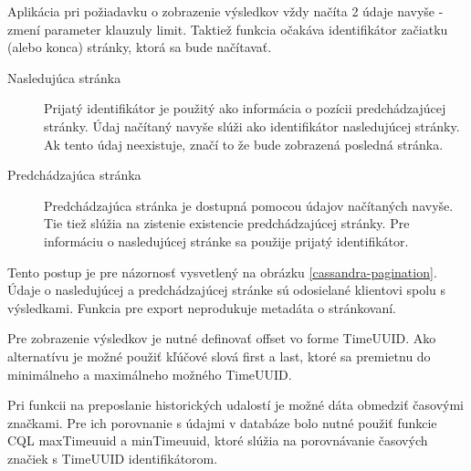 		Aplikácia pri požiadavku o zobrazenie výsledkov vždy načíta 2 údaje navyše - zmení parameter klauzuly limit. Taktiež funkcia očakáva identifikátor začiatku (alebo konca) stránky, ktorá sa bude načítavať.
		\begin{description}
			\item[Nasledujúca stránka] Prijatý identifikátor je použitý ako informácia o pozícii predchádzajúcej stránky. Údaj načítaný navyše slúži ako identifikátor nasledujúcej stránky. Ak tento údaj neexistuje, značí to že bude zobrazená posledná stránka.
				
			\item[Predchádzajúca stránka] Predchádzajúca stránka je dostupná pomocou údajov načítaných navyše. Tie tiež slúžia na zistenie existencie predchádzajúcej stránky. Pre informáciu o nasledujúcej stránke sa použije prijatý identifikátor.
		\end{description}
		
		Tento postup je pre názornosť vysvetlený na obrázku \ref{cassandra-pagination}. Údaje o nasledujúcej a predchádzajúcej stránke sú odosielané klientovi spolu s výsledkami. Funkcia pre export neprodukuje metadáta o stránkovaní. 
		
		Pre zobrazenie výsledkov je nutné definovať offset vo forme TimeUUID. Ako alternatívu je možné použiť kľúčové slová first a last, ktoré sa premietnu do minimálneho a maximálneho možného TimeUUID.

		Pri funkcii na preposlanie historických udalostí je možné dáta obmedziť časovými značkami. Pre ich porovnanie s údajmi v databáze bolo nutné použiť funkcie CQL maxTimeuuid a minTimeuuid, ktoré slúžia na porovnávanie časových značiek s TimeUUID identifikátorom.
		
